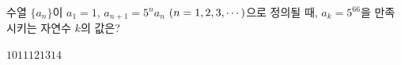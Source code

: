 \hspace*{2mm}\begin{minipage}[t]{\dimexpr\linewidth-2mm\relax}\vspace{0pt}
수열 $\{a_n\}$이 $a_1=1$, $a_{n+1}=5^na_n$ $(n=1{,}\mkern3mu\mathopen{}2{,}\mkern3mu\mathopen{}3{,}\mkern3mu\mathopen{}\cdots)$으로 정의될 때, $a_k=5^{66}$을 만족시키는 자연수 $k$의 값은?
\begin{choices32}{$10$}{$11$}{$12$}{$13$}{$14$}\end{choices32}\end{minipage}
